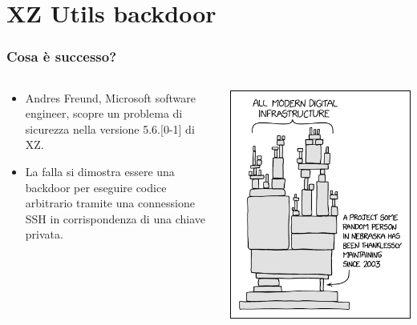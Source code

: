 
\section{XZ Utils backdoor} %


\begin{frame}
\frametitle{Cosa è successo?}

\begin{columns}
        \begin{column}{0.5\textwidth}
            \begin{itemize}
                \item Andres Freund, Microsoft software engineer, scopre un problema di sicurezza nella versione 5.6.[0-1] di XZ.
                \item La falla si dimostra essere una backdoor per eseguire codice arbitrario tramite una connessione SSH in corrispondenza di una chiave privata.
            \end{itemize}
        \end{column}
        \begin{column}{0.5\textwidth}
            \centering
            \includegraphics[width=\textwidth]{img/2-Introduction/dependency_2x.png}
        \end{column}
\end{columns}

\end{frame}


